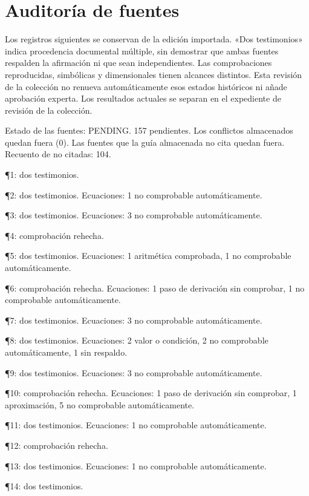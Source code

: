\documentclass[10pt,openany]{book}
\begin{document}
\chapter{Auditoría de fuentes}
Los registros siguientes se conservan de la edición importada. «Dos testimonios» indica procedencia documental múltiple, sin demostrar que ambas fuentes respalden la afirmación ni que sean independientes. Las comprobaciones reproducidas, simbólicas y dimensionales tienen alcances distintos. Esta revisión de la colección no renueva automáticamente esos estados históricos ni añade aprobación experta. Los resultados actuales se separan en el expediente de revisión de la colección.



\noindent Estado de las fuentes: PENDING. 157 pendientes. Los conflictos almacenados quedan fuera (0). Las fuentes que la guía almacenada no cita quedan fuera. Recuento de no citadas: 104.\par
\noindent ¶1: dos testimonios.\par
\noindent ¶2: dos testimonios. Ecuaciones: 1 no comprobable automáticamente.\par
\noindent ¶3: dos testimonios. Ecuaciones: 3 no comprobable automáticamente.\par
\noindent ¶4: comprobación rehecha.\par
\noindent ¶5: dos testimonios. Ecuaciones: 1 aritmética comprobada, 1 no comprobable automáticamente.\par
\noindent ¶6: comprobación rehecha. Ecuaciones: 1 paso de derivación sin comprobar, 1 no comprobable automáticamente.\par
\noindent ¶7: dos testimonios. Ecuaciones: 3 no comprobable automáticamente.\par
\noindent ¶8: dos testimonios. Ecuaciones: 2 valor o condición, 2 no comprobable automáticamente, 1 sin respaldo.\par
\noindent ¶9: dos testimonios. Ecuaciones: 3 no comprobable automáticamente.\par
\noindent ¶10: comprobación rehecha. Ecuaciones: 1 paso de derivación sin comprobar, 1 aproximación, 5 no comprobable automáticamente.\par
\noindent ¶11: dos testimonios. Ecuaciones: 1 no comprobable automáticamente.\par
\noindent ¶12: comprobación rehecha.\par
\noindent ¶13: dos testimonios. Ecuaciones: 1 no comprobable automáticamente.\par
\noindent ¶14: dos testimonios.\par
\end{document}
